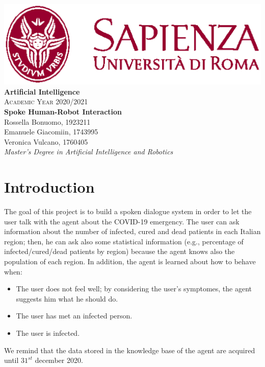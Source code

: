\documentclass{article}
\title{\textbf{ }}
\date{}
\begin{document}
\begin{titlepage}
    \begin{center}
        \includegraphics[width=0.4 \textwidth] {logo.eps}\\
        \vspace{10 em}
        {\Large \textbf{Artificial Intelligence}}\\
        \vspace{3em}
        {\Large \textsc{Academic Year 2020/2021}}\\
        \vspace{8 em}
        {\huge \textbf{Spoke Human-Robot Interaction}}\\
        \vspace{3 em}
        {\large Rossella Bonuomo, 1923211}\\
        \vspace{1 em}
        {\large Emanuele Giacomiin, 1743995}\\
        \vspace{1 em}
        {\large Veronica Vulcano, 1760405}
        \vspace{10 em}\\
        {\Large \textit{Master's Degree in Artificial Intelligence and Robotics}}
    \end{center}
\end{titlepage}

\maketitle
\tableofcontents
\pagebreak

\section{Introduction}
The goal of this project is to build a spoken dialogue system in order to let the user talk with the agent about the COVID-19 emergency. The user can ask information about the number of infected, cured and dead patients in each Italian region; then, he can ask also some statistical information (e.g., percentage of infected/cured/dead patients by region) because the agent knows also the population of each region. In addition, the agent is learned about how to behave when:
\begin{itemize}
\item The user does not feel well; by considering the user's symptomes, the agent suggests him what he should do.
\item The user has met an infected person.
\item The user is  infected.
\end{itemize}
We remind that the data stored in the knowledge base of the agent are acquired until $31^{st}$ december 2020.
\end{document}
